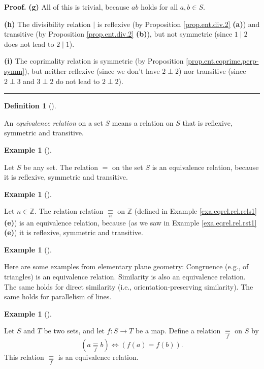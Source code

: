 \documentclass[numbers=enddot,12pt,final,onecolumn,notitlepage]{scrartcl}%
\numberwithin{exer}{subsection}
\theoremstyle{definition}
\newtheorem{defi}[theo]{Definition}
\newenvironment{definition}[1][]
{\begin{defi}[#1]\begin{leftbar}}
{\end{leftbar}\end{defi}}
\newtheorem{exam}[theo]{Example}
\newenvironment{example}[1][]
{\begin{exam}[#1]\begin{leftbar}}
{\end{leftbar}\end{exam}}
\newenvironment{proof}[1][Proof]{\noindent\textbf{#1.} }{\ \rule{0.5em}{0.5em}}
\begin{document}
\begin{proof}
\textbf{(g)} All of this is trivial, because $a$$b$ holds for all
$a,b\in S$.

\textbf{(h)} The divisibility relation $\mid$ is reflexive (by Proposition
\ref{prop.ent.div.2} \textbf{(a)}) and transitive (by Proposition
\ref{prop.ent.div.2} \textbf{(b)}), but not symmetric (since $1\mid2$ does not
lead to $2\mid1$).

\textbf{(i)} The coprimality relation is symmetric (by Proposition
\ref{prop.ent.coprime.perp-symm}), but neither reflexive (since we don't have
$2\perp2$) nor transitive (since $2\perp3$ and $3\perp2$ do not lead to
$2\perp2$).
\end{proof}

\begin{definition}
\label{def.eqrel.rel.eqrel}An \textit{equivalence relation} on a set $S$ means
a relation on $S$ that is reflexive, symmetric and transitive.
\end{definition}

\begin{example}
\label{exa.eqrel.eqrel.eqrel=}Let $S$ be any set. The relation $=$ on the set
$S$ is an equivalence relation, because it is reflexive, symmetric and transitive.
\end{example}

\begin{example}
\label{exa.eqrel.eqrel.eqrelmodn}Let $n\in\mathbb{Z}$. The relation relation
$\underset{n}{\equiv}$ on $\mathbb{Z}$ (defined in Example
\ref{exa.eqrel.rel.rels1} \textbf{(e)}) is an equivalence relation, because
(as we saw in Example \ref{exa.eqrel.rel.rst1} \textbf{(e)}) it is reflexive,
symmetric and transitive.
\end{example}

\begin{example}
Here are some examples from elementary plane geometry: Congruence (e.g., of
triangles) is an equivalence relation. Similarity is also an equivalence
relation. The same holds for direct similarity (i.e., orientation-preserving
similarity). The same holds for parallelism of lines.
\end{example}

\begin{example}
\label{exa.eqrel.eqrel.eqrelf}Let $S$ and $T$ be two sets, and let
$f:S\rightarrow T$ be a map. Define a relation $\underset{f}{\equiv}$ on $S$
by%
\[
\left(  a\underset{f}{\equiv}b\right)  \Longleftrightarrow\left(  f\left(
a\right)  =f\left(  b\right)  \right)  .
\]
This relation $\underset{f}{\equiv}$ is an equivalence relation.
\end{example}
\end{document}

